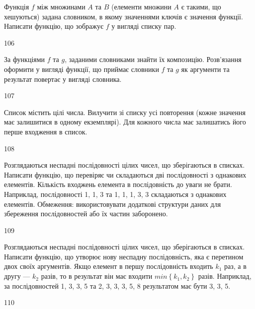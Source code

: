 Функція $f$ між множинами $A$ та $B$ (елементи множини $A$ є такими, що хешуються) задана словником, в якому значеннями ключів є значення функції. Написати функцію, що зображує $f$ у вигляді списку пар.
\\\par
106 














За функціями $f$ та $g$, заданими словниками знайти їх композицію. Розв’язання оформити у вигляді функції, що приймає словники $f$ та $g$ як аргументи та результат повертає у вигляді словника.
\\\par
107 














Список містить цілі числа. Вилучити зі списку усі повторення (кожне значення має залишитися в одному екземплярі). Для кожного числа має залишатись його перше входження в список.
\\\par
108 














Розглядаються неспадні послідовності цілих чисел, що зберігаються в списках. Написати функцію, що перевіряє чи складаються дві послідовності з однакових елементів. Кількість входжень елемента в послідовність до уваги не брати. Наприклад, послідовності 1, 1, 3 та 1, 1, 1, 3, 3 складаються з однакових елементів. Обмеження: використовувати додаткові структури даних для збереження послідовностей або їх частин заборонено.
\\\par
109 














Розглядаються неспадні послідовності цілих чисел, що зберігаються в списках. Написати функцію, що утворює нову неспадну послідовність, яка є перетином двох своїх аргументів. Якщо елемент в першу послідовність входить $k_1$ раз, а в другу --- $k_2$ разів, то в результат він має входити $min\left\{k_1,k_2\right\}$ разів. Наприклад, за послідовностей 1, 3, 3, 5 та 2, 3, 3, 3, 5, 8 результатом має бути 3, 3, 5.
\\\par
110 














